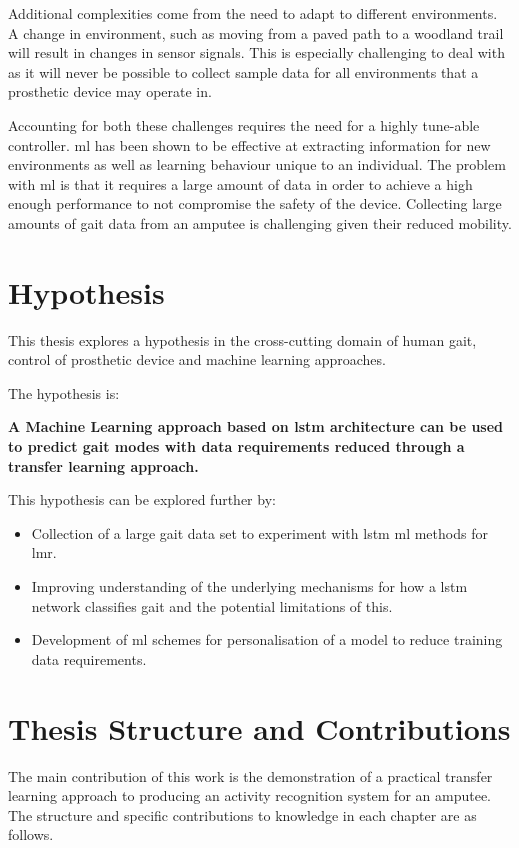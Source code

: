 Additional complexities come from the need to adapt to different environments. A change in environment, such as moving from a paved path to a woodland trail will result in changes in sensor signals. This is especially challenging to deal with as it will never be possible to collect sample data for all environments that a prosthetic device may operate in.

Accounting for both these challenges requires the need for a highly tune-able controller. \acrfull{ml} has been shown to be effective at extracting information for new environments as well as learning behaviour unique to an individual. The problem with \acrshort{ml} is that it requires a large amount of data in order to achieve a high enough performance to not compromise the safety of the device. Collecting large amounts of gait data from an amputee is challenging given their reduced mobility.

\section{Hypothesis} %
This thesis explores a hypothesis in the cross-cutting domain of human gait, control of prosthetic device and machine learning approaches.

The hypothesis is:

\textbf{A Machine Learning approach based on \acrfull{lstm} architecture can be used to predict gait modes with data requirements reduced through a transfer learning approach.}

This hypothesis can be explored further by: 

\begin{itemize}
    \item Collection of a large gait data set to experiment with \acrshort{lstm} \acrshort{ml} methods for \acrfull{lmr}.
    \item Improving understanding of the underlying mechanisms for how a \acrshort{lstm} network classifies gait and the potential limitations of this.
    \item Development of \acrshort{ml} schemes for personalisation of a model to reduce training data requirements.
\end{itemize}


\section{Thesis Structure and Contributions}
The main contribution of this work is the demonstration of a practical transfer learning approach to producing an activity recognition system for an amputee. The structure and specific contributions to knowledge in each chapter are as follows.


